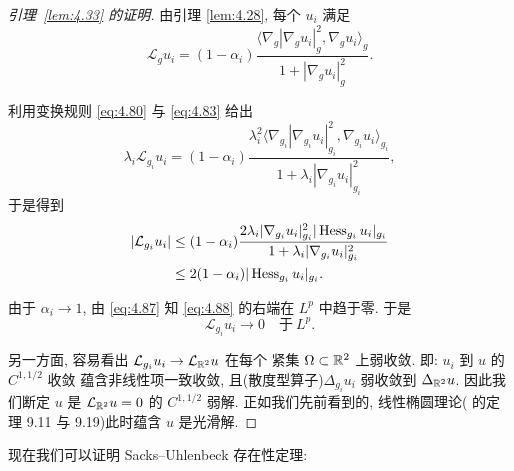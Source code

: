 \begin{proof}[引理~\ref{lem:4.33} 的证明]
由引理 \ref{lem:4.28}, 每个 $u_i$ 满足
\begin{equation*}
\mathcal{L}_gu_i=(1-\alpha_i)
 \frac{\bigl\langle\nabla_g|\nabla_gu_i|_g^2,\nabla_gu_i\bigr\rangle_g}
      {1+|\nabla_gu_i|_g^2}.
\end{equation*}

利用变换规则 \eqref{eq:4.80} 与 \eqref{eq:4.83} 给出
\begin{equation*}
\lambda_i\mathcal{L}_{g_i}u_i=(1-\alpha_i)
 \frac{\lambda_i^2\bigl\langle\nabla_{g_i}|\nabla_{g_i}u_i|_{g_i}^2,
 \nabla_{g_i}u_i\bigr\rangle_{g_i}}
 {1+\lambda_i|\nabla_{g_i}u_i|_{g_i}^2},
\end{equation*}
于是得到
\begin{equation}
\begin{aligned}
|\mathcal{L}_{g_i}u_i|
&\leq(1-\alpha_i)
 \frac{2\lambda_i|\nabla_{g_i}u_i|_{g_i}^2
  |\operatorname{Hess}_{g_i}u_i|_{g_i}}
 {1+\lambda_i|\nabla_{g_i}u_i|_{g_i}^2}\\
&\leq2(1-\alpha_i)|\operatorname{Hess}_{g_i}u_i|_{g_i}.
\end{aligned}
\label{eq:4.88}
\end{equation}

由于 $\alpha_i\to1$, 由 \eqref{eq:4.87} 知 \eqref{eq:4.88} 的右端在
$L^p$ 中趋于零. 于是
\begin{equation*}
\mathcal{L}_{g_i}u_i\to0\quad\text{于}\ L^p.
\end{equation*}

另一方面, 容易看出 $\mathcal{L}_{g_i}u_i\to\mathcal{L}_{\mathbb{R}^2}u$ 在每个
紧集 $\Omega\subset\mathbb{R}^2$ 上弱收敛. 即: $u_i$ 到 $u$ 的 $C^{1,1/2}$ 收敛
蕴含非线性项一致收敛, 且(散度型算子)$\Delta_{g_i}u_i$ 弱收敛到
$\Delta_{\mathbb{R}^2}u$. 因此我们断定 $u$ 是 $\mathcal{L}_{\mathbb{R}^2}u=0$ 的
$C^{1,1/2}$ 弱解. 正如我们先前看到的, 线性椭圆理论(\cite{GiTr} 的定理
9.11 与 9.19)此时蕴含 $u$ 是光滑解.
\end{proof}

现在我们可以证明 Sacks--Uhlenbeck 存在性定理:

